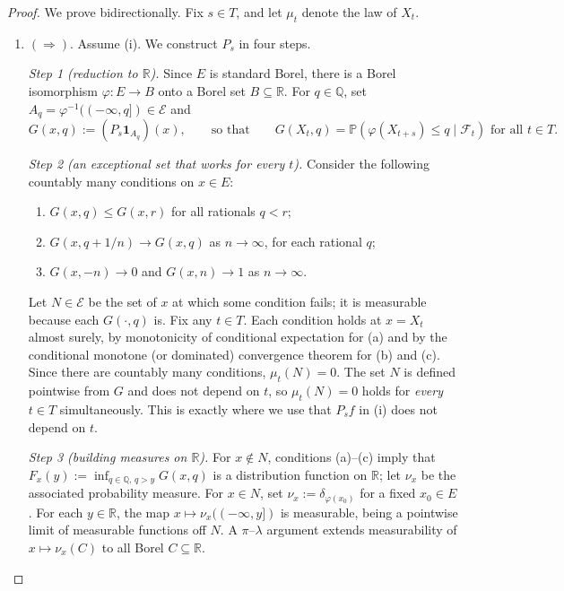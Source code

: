 	\begin{proof}
	  We prove bidirectionally. Fix $s \in T$, and let $\mu_t$ denote the law of $X_t$.
		\begin{enumerate}
		  \item $(\Rightarrow)$. Assume (i). We construct $P_s$ in four steps. 

			\textit{Step 1 (reduction to $\mathbb{R}$).} Since $E$ is standard Borel, there is a Borel isomorphism $\varphi : E \to B$ onto a Borel set $B \subseteq \mathbb{R}$. For $q \in \mathbb{Q}$, set $A_q = \varphi^{-1}((-\infty, q]) \in \mathcal{E}$ and
			\[
				G(x, q) := (P_s \mathbf{1}_{A_q})(x), \qquad \text{so that} \qquad G(X_t, q) = \mathbb{P}(\varphi(X_{t+s}) \leq q \mid \mathcal{F}_t) \text{ for all } t \in T.
			\]

			\textit{Step 2 (an exceptional set that works for every $t$).} Consider the following countably many conditions on $x \in E$:
			\begin{enumerate}
				\item[(a)] $G(x, q) \leq G(x, r)$ for all rationals $q < r$;
				\item[(b)] $G(x, q + 1/n) \to G(x, q)$ as $n \to \infty$, for each rational $q$;
				\item[(c)] $G(x, -n) \to 0$ and $G(x, n) \to 1$ as $n \to \infty$.
			\end{enumerate}
			Let $N \in \mathcal{E}$ be the set of $x$ at which some condition fails; it is measurable because each $G(\cdot, q)$ is. Fix any $t \in T$. Each condition holds at $x = X_t$ almost surely, by monotonicity of conditional expectation for (a) and by the conditional monotone (or dominated) convergence theorem for (b) and (c). Since there are countably many conditions, $\mu_t(N) = 0$. The set $N$ is defined pointwise from $G$ and does not depend on $t$, so $\mu_t(N) = 0$ holds for \emph{every} $t \in T$ simultaneously. This is exactly where we use that $P_s f$ in (i) does not depend on $t$.

			\textit{Step 3 (building measures on $\mathbb{R}$).} For $x \notin N$, conditions (a)--(c) imply that $F_x(y) := \inf_{q \in \mathbb{Q},\, q > y} G(x, q)$ is a distribution function on $\mathbb{R}$; let $\nu_x$ be the associated probability measure. For $x \in N$, set $\nu_x := \delta_{\varphi(x_0)}$ for a fixed $x_0 \in E$. For each $y \in \mathbb{R}$, the map $x \mapsto \nu_x((-\infty, y])$ is measurable, being a pointwise limit of measurable functions off $N$. A $\pi$--$\lambda$ argument extends measurability of $x \mapsto \nu_x(C)$ to all Borel $C \subseteq \mathbb{R}$.


\end{enumerate}
\end{proof}
